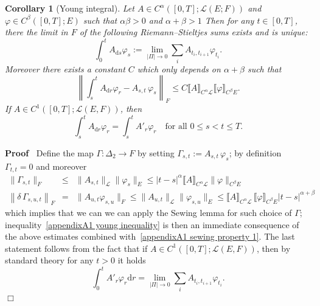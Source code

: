 \documentclass[10pt]{article}
\newcommand{\assign}{:=}
\newcommand{\mathd}{\mathrm{d}}
\newenvironment{proof}{\noindent\textbf{Proof\ }}{\hspace*{\fill}$\Box$\medskip}
\newtheorem{corollary}[theorem]{Corollary}
\begin{document}
\begin{corollary}[Young integral]
  \label{appendixA1 corollary young}Let $A \in C^{\alpha} ([0, T] ;
  \mathcal{L} (E ; F))$ and $\varphi \in C^{\beta} ([0, T] ; E)$ such that
  $\alpha \beta > 0$ and $\alpha + \beta > 1$ Then for any $t \in [0, T]$,
  there the limit in $F$ of the following Riemann--Stieltjes sums exists and
  is unique:
  \[ \int_0^t A_{\mathd s} \varphi_s \assign \lim_{| \Pi | \rightarrow 0}
     \sum_i A_{t_i, t_{i + 1}} \varphi_{t_i} . \]
  Moreover there exists a constant $C$ which only depends on $\alpha + \beta$
  such that
  \begin{equation}
    \left\| \int_s^t A_{\mathd r} \varphi_r - A_{s, t} \, \varphi_s \right\|_F
    \leqslant C \llbracket A \rrbracket_{C^{\alpha} \mathcal{L}}  \llbracket
    \varphi \rrbracket_{C^{\beta} E} . \label{appendixA1 young inequality}
  \end{equation}
  If $A \in C^1 ([0, T] ; \mathcal{L} (E, F))$, then
  \[ \int_s^t A_{\mathd r} \varphi_r = \int_s^t A'_r \varphi_r \quad \text{for
     all } 0 \leqslant s < t \leqslant T. \]
\end{corollary}

\begin{proof}
  Define the map $\Gamma : \Delta_2 \rightarrow F$ by setting $\Gamma_{s, t}
  \assign A_{s, t} \, \varphi_s$; by definition $\Gamma_{t, t} = 0$ and
  moreover
  \begin{eqnarray*}
    \| \Gamma_{s, t} \|_F & \leqslant & \| A_{s, t} \|_{\mathcal{L}} \|
    \varphi_s \|_E \leqslant | t - s |^{\alpha} \llbracket A
    \rrbracket_{C^{\alpha} \mathcal{L}}  \| \varphi \|_{C^{\beta} E}\\
    \left\| \delta \, \Gamma_{s, u, t} \right\|_F & = & \| A_{u, t}
    \varphi_{s, u} \|_F \leqslant \| A_{u, t} \|_{\mathcal{L}} \| \varphi_{s,
    u} \|_E \leqslant \llbracket A \rrbracket_{C^{\alpha} \mathcal{L}} \,
    \llbracket \varphi \rrbracket_{C^{\beta} E} | t - s |^{\alpha + \beta}
  \end{eqnarray*}
  which implies that we can we can apply the Sewing lemma for such choice of
  $\Gamma$; inequality~{\eqref{appendixA1 young inequality}} is then an
  immediate consequence of the above estimates combined
  with~{\eqref{appendixA1 sewing property 1}}. The last statement follows from
  the fact that if $A \in C^1 ([0, T] ; \mathcal{L} (E, F))$, then by standard
  theory for any $t > 0$ it holds
  \[ \int_0^t A'_r \varphi_r \mathd r = \lim_{| \Pi | \rightarrow 0} \sum_i
     A_{t_i, t_{i + 1}} \varphi_{t_i} . \]
\end{proof}
\end{document}
